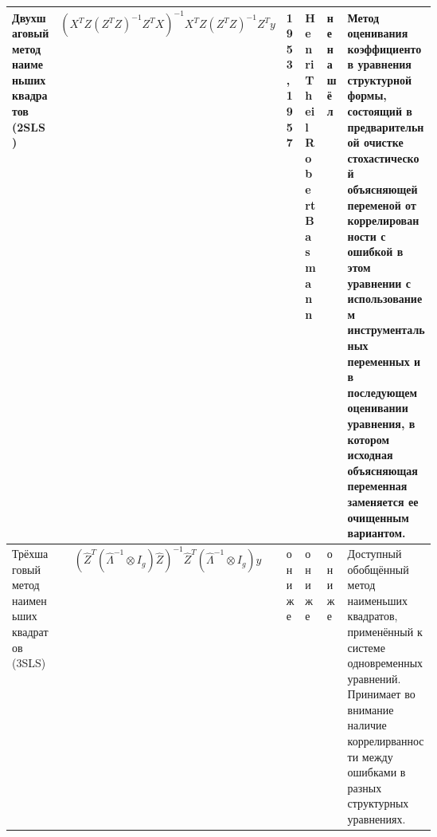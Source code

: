 \documentclass[10pt,a4paper]{article}
\begin{document}
\begin{table}[H]
{\begin{tabular}{|m{0.15\linewidth}|m{0.17\linewidth}|Z|Y{0.1}|Y{0.18}|m{0.3\linewidth}|}
Двухшаговый метод \newline наименьших квадратов \newline (2SLS) & \small{\[(X^T Z (Z^T Z)^{-1} Z^T X)^{-1} X^T Z(Z^T Z)^{-1} Z^Ty \]} & 1953 ,  1957 & Henri Theil \newline Robert Basmann  & не нашёл &  Метод оценивания коэффициентов уравнения структурной формы, состоящий в предварительной очистке стохастической объясняющей переменой от коррелированности с ошибкой в этом уравнении с использованием инструментальных переменных и в последующем оценивании уравнения, в котором исходная объясняющая переменная заменяется ее очищенным вариантом. \\
\hline
Трёхшаговый метод \newline наименьших квадратов \newline (3SLS) & \[ (\hat Z^T(\hat \Lambda^{-1} \otimes I_g) \hat Z)^{-1} \hat Z^T (\hat \Lambda^{-1} \otimes I_g)y \] & они же & они же & они же & Доступный обобщённый метод наименьших квадратов, применённый к системе одновременных уравнений. Принимает во внимание наличие коррелирванности между ошибками в разных \newline структурных уравнениях. \\
\hline
\end{tabular}}
\end{table}



\newpage
\end{document}

